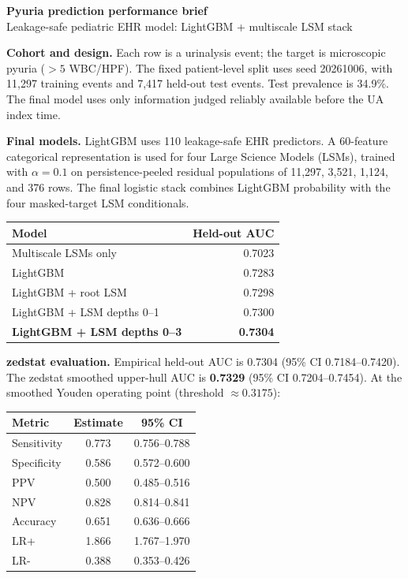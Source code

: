 \documentclass[10pt]{article}
\begin{document}
\begin{center}
{\Large\bfseries Pyuria prediction performance brief}\\[3pt]
{\small Leakage-safe pediatric EHR model: LightGBM + multiscale LSM stack}
\end{center}

\noindent\textbf{Cohort and design.} Each row is a urinalysis event; the target is microscopic pyuria ($>5$ WBC/HPF). The fixed patient-level split uses seed 20261006, with 11,297 training events and 7,417 held-out test events. Test prevalence is 34.9\%. The final model uses only information judged reliably available before the UA index time.

\vspace{3pt}
\noindent\textbf{Final models.} LightGBM uses 110 leakage-safe EHR predictors. A 60-feature categorical representation is used for four Large Science Models (LSMs), trained with $\alpha=0.1$ on persistence-peeled residual populations of 11,297, 3,521, 1,124, and 376 rows. The final logistic stack combines LightGBM probability with the four masked-target LSM conditionals.

\begin{table}[h!]
\centering
\small
\begin{tabular}{lr}
\toprule
Model & Held-out AUC \\
\midrule
Multiscale LSMs only & 0.7023 \\
LightGBM & 0.7283 \\
LightGBM + root LSM & 0.7298 \\
LightGBM + LSM depths 0--1 & 0.7300 \\
\textbf{LightGBM + LSM depths 0--3} & \textbf{0.7304} \\
\bottomrule
\end{tabular}
\end{table}

\noindent\textbf{zedstat evaluation.} Empirical held-out AUC is 0.7304 (95\% CI 0.7184--0.7420). The zedstat smoothed upper-hull AUC is \textbf{0.7329} (95\% CI 0.7204--0.7454). At the smoothed Youden operating point (threshold $\approx0.3175$):

\begin{table}[h!]
\centering
\small
\begin{tabular}{lcc}
\toprule
Metric & Estimate & 95\% CI \\
\midrule
Sensitivity & 0.773 & 0.756--0.788 \\
Specificity & 0.586 & 0.572--0.600 \\
PPV & 0.500 & 0.485--0.516 \\
NPV & 0.828 & 0.814--0.841 \\
Accuracy & 0.651 & 0.636--0.666 \\
LR+ & 1.866 & 1.767--1.970 \\
LR- & 0.388 & 0.353--0.426 \\
\bottomrule
\end{tabular}
\end{table}
\end{document}
